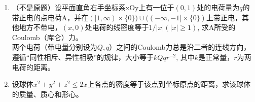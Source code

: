 \begin{enumerate}
    \item （不是原题）设平面直角右手坐标系xOy上有一位于$(0,1)$处的电荷量为$q$的带正电的点电荷A，并在$([1,\infty)\times\{0\})\cup((-\infty,-1]\times\{0\})$上带正电，其他地方不带电，$(x,0)$处电荷的线密度等于$1/|x|(|x|\geqslant 1)$, 求A所受的Coulomb（库仑）力。\\
    两个电荷（带电量分别设为$Q,q$）之间的Coulomb力总是沿二者的连线方向，遵循“同性相斥、异性相吸”的规律，大小等于$kQqr^{-2}$, 其中$k$是正常量，$r$为两电荷的距离。
    \item 设球体$x^2+y^2+z^2\leqslant 2x$上各点的密度等于该点到坐标原点的距离，求该球体的质量、质心和形心。
\end{enumerate}